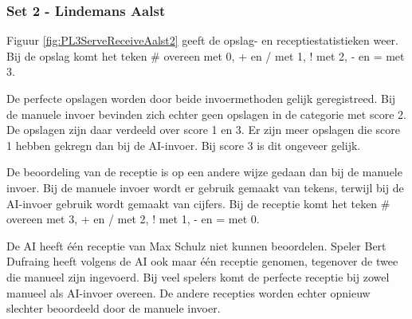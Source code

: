 \subsubsection{Set 2 - Lindemans Aalst}
\label{sec:PL3_Aalst2}
Figuur \ref{fig:PL3ServeReceiveAalst2} geeft de opslag- en receptiestatistieken weer. Bij de opslag komt het teken \# overeen met 0, + en / met 1, ! met 2, - en = met 3.

De perfecte opslagen worden door beide invoermethoden gelijk geregistreed. Bij de manuele invoer bevinden zich echter geen opslagen in de categorie met score 2. De opslagen zijn daar verdeeld over score 1 en 3. Er zijn meer opslagen die score 1 hebben gekregn dan bij de AI-invoer. Bij score 3 is dit ongeveer gelijk.

De beoordeling van de receptie is op een andere wijze gedaan dan bij de manuele invoer. Bij de manuele invoer wordt er gebruik gemaakt van tekens, terwijl bij de AI-invoer gebruik wordt gemaakt van cijfers. Bij de receptie komt het teken \# overeen met 3, + en / met 2, ! met 1, - en = met 0.

De AI heeft één receptie van Max Schulz niet kunnen beoordelen. Speler Bert Dufraing heeft volgens de AI ook maar één receptie genomen, tegenover de twee die manueel zijn ingevoerd. Bij veel spelers komt de perfecte receptie bij zowel manueel als AI-invoer overeen. De andere recepties worden echter opnieuw slechter beoordeeld door de manuele invoer.

